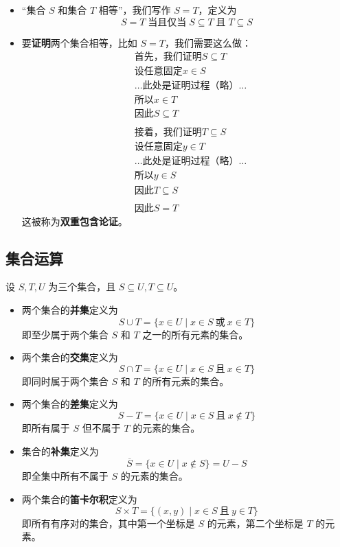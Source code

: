\begin{itemize}
    \item ``集合 $S$ 和集合 $T$ 相等''，我们写作 $S=T$，定义为
        \[S = T \;\text{当且仅当}\; S \subseteq T \;\text{且}\; T \subseteq S\]
    \item 要\textbf{证明}两个集合相等，比如 $S=T$，我们需要这么做：
        \begin{align*}
            &\text{首先，我们证明}S \subseteq T\\
            &\text{设任意固定} x \in S \\
            &\dots \text{此处是证明过程（略）}\dots\\
            &\text{所以}x \in T\\
            &\text{因此}S \subseteq T\\
            \\
            &\text{接着，我们证明}T \subseteq S\\
            &\text{设任意固定} y \in T \\
            &\dots \text{此处是证明过程（略）}\dots\\
            &\text{所以}y \in S\\
            &\text{因此}T \subseteq S\\
            \\
            &\text{因此}S = T
        \end{align*}
        这被称为\textbf{双重包含论证}。
\end{itemize}

\subsection{集合运算}

设 $S,T,U$ 为三个集合，且 $S \subseteq U, T \subseteq U$。

\begin{itemize}
    \item 两个集合的\textbf{并集}定义为
        \[ S \cup T = \{x \in U \mid x \in S \:\text{或}\: x \in T\}\]
        即至少属于两个集合 $S$ 和 $T$ 之一的所有元素的集合。
    \item 两个集合的\textbf{交集}定义为
        \[S \cap T = \{x \in U \mid x \in S \:\text{且}\: x \in T\}\]
        即同时属于两个集合 $S$ 和 $T$ 的所有元素的集合。
    \item 两个集合的\textbf{差集}定义为
        \[S - T = \{x \in U \mid x \in S \:\text{且}\: x \notin T\}\]
        即所有属于 $S$ 但不属于 $T$ 的元素的集合。
    \item 集合的\textbf{补集}定义为
        \[\overline{S} = \{x\in U \mid x \notin S\}=U-S\]
        即全集中所有不属于 $S$ 的元素的集合。
    \item 两个集合的\textbf{笛卡尔积}定义为
        \[S \times T = \{(x,y) \mid x \in S \:\text{且}\: y \in T\}\]
        即所有有序对的集合，其中第一个坐标是 $S$ 的元素，第二个坐标是 $T$ 的元素。
\end{itemize}

